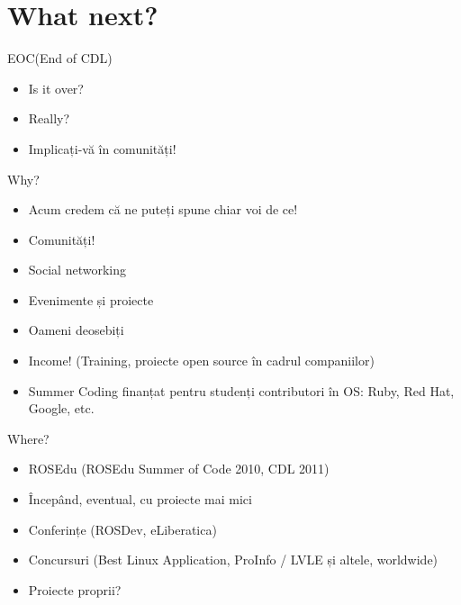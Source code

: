 \documentclass{beamer}
\begin{document}
\section{What next?}

\begin{frame}{EOC(End of CDL)}
  \begin{itemize} %
  \pause
  \item Is it over?
  \pause
  \item Really?
  \pause
  \item Implicați-vă în comunități!
  \pause
  \end{itemize}
\end{frame}

\begin{frame}{Why?}
  \begin{itemize} %
  \pause
  \item Acum credem că ne puteți spune chiar voi de ce!
  \pause
  \item Comunități!
  \item Social networking
  \item Evenimente și proiecte
  \item Oameni deosebiți
  \item Income! (Training, proiecte open source în cadrul companiilor)
  \item Summer Coding finanțat pentru studenți contributori în OS: Ruby, Red Hat, Google, etc.
  \end{itemize}
\end{frame}

\begin{frame}{Where?}
  \begin{itemize} %
  \pause
  \item ROSEdu (ROSEdu Summer of Code 2010, CDL 2011)
  \pause
  \item Începând, eventual, cu proiecte mai mici 
  \pause
  \item Conferințe (ROSDev, eLiberatica)
  \pause
  \item Concursuri (Best Linux Application, ProInfo / LVLE și altele, worldwide)
  \pause
  \item Proiecte proprii?
  \end{itemize}
\end{frame}
\end{document}

